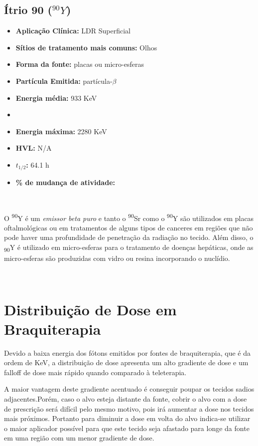\documentclass[11pt,a4paper]{article}
\begin{document}
		\subsection{Ítrio 90 \textbf{\textcolor{CarnationPink}{(${}^{90}Y$)}}}

			\begin{itemize}
				\item \textbf{Aplicação Clínica:} LDR Superficial
				\item \textbf{Sítios de tratamento mais comuns:} Olhos
				\item \textbf{Forma da fonte:} placas ou micro-esferas
				\item \textbf{Partícula Emitida:} partícula-$\beta$
				\item \textbf{Energia média: } 933 KeV 
				\item \item \textbf{Energia máxima: } 2280 KeV
				\item \textbf{HVL:} N/A
				\item \textbf{$t_{1/2}$:} 64.1 h
				\item \textbf{\% de mudança de atividade: } 
			\end{itemize}

		\

			O \textsuperscript{90}Y é um \textit{\textcolor{CarnationPink}{emissor beta puro}} e tanto o \textsuperscript{90}Sr como o \textsuperscript{90}Y são utilizados em placas oftalmológicas ou em tratamentos de alguns tipos de canceres em regiões que não pode haver uma profundidade de penetração da radiação no tecido. Além disso, o \textsubscript{90}Y é utilizado em micro-esferas para o tratamento de doenças hepáticas, onde as micro-esferas são produzidas com vidro ou resina incorporando o nuclídio.

		\

	\section{Distribuição de Dose em Braquiterapia}

		Devido a baixa energia dos fótons emitidos por fontes de braquiterapia, que é da ordem de KeV, a distribuição de dose apresenta um alto gradiente de dose e um falloff de dose mais rápido quando comparado à teleterapia.

		A maior vantagem deste gradiente acentuado é conseguir poupar os tecidos sadios adjacentes.Porém, caso o alvo esteja distante da fonte, cobrir o alvo com a dose de prescrição será difícil pelo mesmo motivo, pois irá aumentar a dose nos tecidos mais próximos. Portanto para diminuir a dose em volta do alvo indica-se utilizar o maior aplicador possível para que este tecido seja afastado para longe da fonte em uma região com um menor gradiente de dose. 
\end{document}
